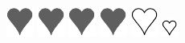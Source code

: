 \documentclass{standalone}
\begin{document}
{\includegraphics{base_E23-6}
	\includegraphics{base_E23-6}
	\includegraphics{base_E23-6}
	\includegraphics{base_E23-6}
	\includegraphics{base_E23-3}
	\includegraphics{base_E23-4}}
\end{document}
